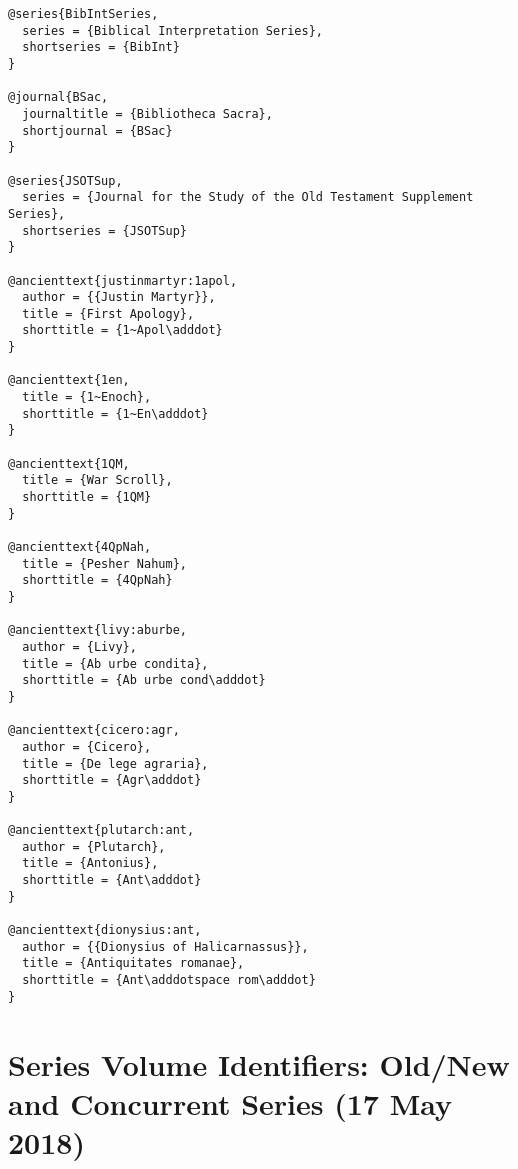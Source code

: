 \documentclass[a4paper]{article}
\begin{document}
\begin{verbatim}
@series{BibIntSeries,
  series = {Biblical Interpretation Series},
  shortseries = {BibInt}
}

@journal{BSac,
  journaltitle = {Bibliotheca Sacra},
  shortjournal = {BSac}
}

@series{JSOTSup,
  series = {Journal for the Study of the Old Testament Supplement Series},
  shortseries = {JSOTSup}
}

@ancienttext{justinmartyr:1apol,
  author = {{Justin Martyr}},
  title = {First Apology},
  shorttitle = {1~Apol\adddot}
}

@ancienttext{1en,
  title = {1~Enoch},
  shorttitle = {1~En\adddot}
}

@ancienttext{1QM,
  title = {War Scroll},
  shorttitle = {1QM}
}

@ancienttext{4QpNah,
  title = {Pesher Nahum},
  shorttitle = {4QpNah}
}

@ancienttext{livy:aburbe,
  author = {Livy},
  title = {Ab urbe condita},
  shorttitle = {Ab urbe cond\adddot}
}

@ancienttext{cicero:agr,
  author = {Cicero},
  title = {De lege agraria},
  shorttitle = {Agr\adddot}
}

@ancienttext{plutarch:ant,
  author = {Plutarch},
  title = {Antonius},
  shorttitle = {Ant\adddot}
}

@ancienttext{dionysius:ant,
  author = {{Dionysius of Halicarnassus}},
  title = {Antiquitates romanae},
  shorttitle = {Ant\adddotspace rom\adddot}
}
\end{verbatim}

\exampleancientsources
\examplesecondarysources
{}

\section{Series Volume Identifiers: Old/New and Concurrent Series (17 May 2018)}
\end{document}
